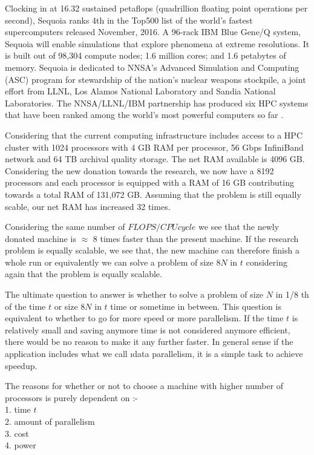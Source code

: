 \documentclass[fleqn,letterpaper,12pt]{report}
\begin{document}
Clocking in at 16.32 sustained petaflops (quadrillion floating point operations per second), Sequoia ranks 4th in the Top500 list of the world's fastest supercomputers released November, 2016. A 96-rack IBM Blue Gene/Q system, Sequoia will enable simulations that explore phenomena at extreme resolutions. It is built out of 98,304 compute nodes; 1.6 million cores; and 1.6 petabytes of memory. Sequoia is dedicated to NNSA's Advanced Simulation and Computing (ASC) program for stewardship of the nation's nuclear weapons stockpile, a joint effort from LLNL, Los Alamos National Laboratory and Sandia National Laboratories. The NNSA/LLNL/IBM partnership has produced six HPC systems that have been ranked among the world's most powerful computers so far \cite{sequoia}. 
\newpage
{}
{}
\problem
Considering that the current computing infrastructure includes access to a HPC cluster with 1024 processors with 4 GB RAM per processor, 56 Gbps InfiniBand network and 64 TB archival quality storage. The net RAM available is 4096 GB. Considering the new donation towards the research, we now have a 8192 processors and each processor is equipped with a RAM of 16 GB contributing towards a total RAM of 131,072 GB. Assuming that the problem is still equally scable, our net RAM has increased 32 times. 

Considering the same number of $FLOPS/CPU cycle$ we see that the newly donated machine is $\approx$ 8 times faster than the present machine. If the research problem is equally scalable, we see that, the new machine can therefore finish a whole run or equivalently we can solve a problem of size $8N$ in $t$ considering again that the problem is equally scalable.

The ultimate question to answer is whether to solve a problem of size $N$ in 1/8 th of the time $t$ or size $8N$ in $t$ time or sometime in between. This question is equivalent to whether to go for more speed or more parallelism. If the time $t$ is relatively small and saving anymore time is not considered anymore efficient, there would be no reason to make it any further faster. In general sense if the application includes what we call \i{data parallelism}, it is a simple task to achieve speedup. 

The reasons for whether or not to choose a machine with higher number of processors is purely dependent on :-\\
1. time $t$ \\
2. amount of parallelism \\
3. cost \\
4. power 
\end{document}
